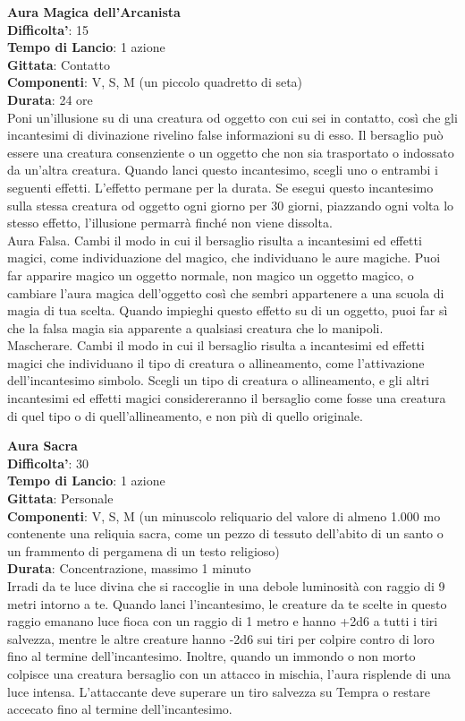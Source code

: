 \begin{multicols}{2}
\medskip\textbf{Aura Magica dell’Arcanista}\\
\textbf{Difficolta'}: 15\\
\textbf{Tempo di Lancio}: 1 azione\\
\textbf{Gittata}: Contatto\\
\textbf{Componenti}: V, S, M (un piccolo quadretto di seta)\\
\textbf{Durata}: 24 ore\\
Poni un’illusione su di una creatura od oggetto con cui sei in contatto, così che gli incantesimi di divinazione rivelino false informazioni su di esso. Il bersaglio può essere una creatura consenziente o un oggetto che non sia trasportato o indossato da un’altra creatura. Quando lanci questo incantesimo, scegli uno o entrambi i seguenti effetti. L’effetto permane per la durata. Se esegui questo incantesimo sulla stessa creatura od oggetto ogni giorno per 30 giorni, piazzando ogni volta lo stesso effetto, l’illusione permarrà finché non viene dissolta.\\
Aura Falsa. Cambi il modo in cui il bersaglio risulta a incantesimi ed effetti magici, come individuazione del magico, che individuano le aure magiche. Puoi far apparire magico un oggetto normale, non magico un oggetto magico, o cambiare l’aura magica dell’oggetto così che sembri appartenere a una scuola di magia di tua scelta. Quando impieghi questo effetto su di un oggetto, puoi far sì che la falsa magia sia apparente a qualsiasi creatura che lo manipoli.\\ Mascherare. Cambi il modo in cui il bersaglio risulta a incantesimi ed effetti magici che individuano il tipo di creatura o allineamento, come l’attivazione dell’incantesimo simbolo. Scegli un tipo di creatura o allineamento, e gli altri incantesimi ed effetti magici considereranno il bersaglio come fosse una creatura di quel tipo o di quell’allineamento, e non più di quello originale.


\medskip\textbf{Aura Sacra}\\
\textbf{Difficolta'}: 30\\
\textbf{Tempo di Lancio}: 1 azione\\
\textbf{Gittata}: Personale\\
\textbf{Componenti}: V, S, M (un minuscolo reliquario del valore di almeno 1.000 mo contenente una reliquia sacra, come un pezzo di tessuto dell’abito di un santo o un frammento di pergamena di un testo religioso)\\
\textbf{Durata}: Concentrazione, massimo 1 minuto\\
Irradi da te luce divina che si raccoglie in una debole luminosità con raggio di 9 metri intorno a te. Quando lanci l’incantesimo, le creature da te scelte in questo raggio emanano luce fioca con un raggio di 1 metro e hanno {+2d6} a tutti i tiri salvezza, mentre le altre creature hanno {-2d6} sui tiri per colpire contro di loro fino al termine dell’incantesimo. Inoltre, quando un immondo o non morto colpisce una creatura bersaglio con un attacco in mischia, l’aura risplende di una luce intensa. L’attaccante deve superare un tiro salvezza su Tempra o restare accecato fino al termine dell’incantesimo.


\end{multicols}
